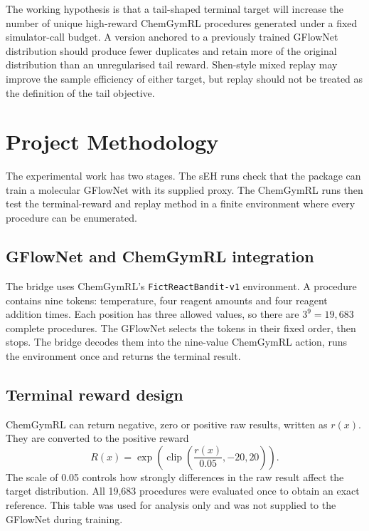 \documentclass{article}
\begin{document}
The working hypothesis is that a tail-shaped terminal target will increase the number of unique high-reward ChemGymRL procedures generated under a fixed simulator-call budget. A version anchored to a previously trained GFlowNet distribution should produce fewer duplicates and retain more of the original distribution than an unregularised tail reward. Shen-style mixed replay may improve the sample efficiency of either target, but replay should not be treated as the definition of the tail objective.

\section{Project Methodology}

The experimental work has two stages. The sEH runs check that the package can train a molecular GFlowNet with its supplied proxy. The ChemGymRL runs then test the terminal-reward and replay method in a finite environment where every procedure can be enumerated.

\subsection{GFlowNet and ChemGymRL integration}

The bridge uses ChemGymRL's \texttt{FictReactBandit-v1} environment. A procedure contains nine tokens: temperature, four reagent amounts and four reagent addition times. Each position has three allowed values, so there are $3^9=19,683$ complete procedures. The GFlowNet selects the tokens in their fixed order, then stops. The bridge decodes them into the nine-value ChemGymRL action, runs the environment once and returns the terminal result.

\subsection{Terminal reward design}

ChemGymRL can return negative, zero or positive raw results, written as $r(x)$. They are converted to the positive reward
\begin{equation}
R(x)=\exp\!\left(\operatorname{clip}\!\left(\frac{r(x)}{0.05},-20,20\right)\right).
\end{equation}
The scale of 0.05 controls how strongly differences in the raw result affect the target distribution. All 19,683 procedures were evaluated once to obtain an exact reference. This table was used for analysis only and was not supplied to the GFlowNet during training.
\end{document}
